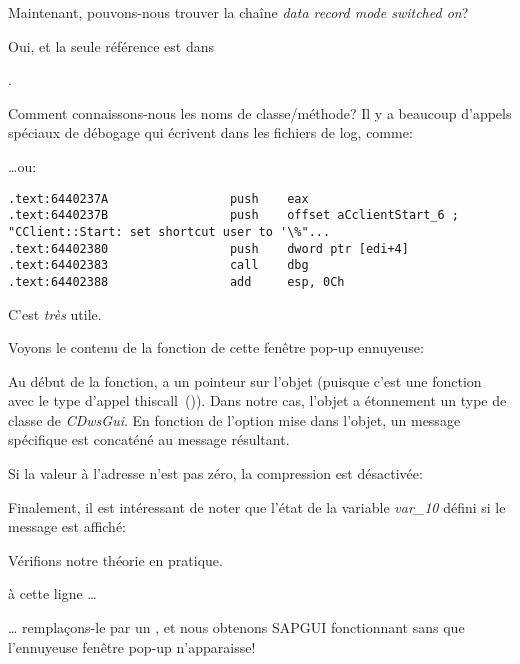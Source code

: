 Maintenant, pouvons-nous trouver la chaîne \emph{data record mode switched on}?

Oui, et la seule référence est dans
\par {}.

Comment connaissons-nous les noms de classe/méthode? Il y a beaucoup d'appels spéciaux
de débogage qui écrivent dans les fichiers de log, comme:



\dots ou:

\begin{lstlisting}[style=customasmx86]
.text:6440237A                 push    eax
.text:6440237B                 push    offset aCclientStart_6 ; "CClient::Start: set shortcut user to '\%"...
.text:64402380                 push    dword ptr [edi+4]
.text:64402383                 call    dbg
.text:64402388                 add     esp, 0Ch
\end{lstlisting}

C'est \emph{très} utile.

Voyons le contenu de la fonction de cette fenêtre pop-up ennuyeuse:



Au début de la fonction, \ECX a un pointeur sur l'objet (puisque c'est une fonction
avec le type d'appel thiscall~()).
Dans notre cas, l'objet a étonnement un type de classe de \emph{CDwsGui}.
En fonction de l'option mise dans l'objet, un message spécifique est concaténé au
message résultant.

Si la valeur à l'adresse  n'est pas zéro, la compression est désactivée:



Finalement, il est intéressant de noter que l'état de la variable \emph{var\_10}
défini si le message est affiché:



Vérifions notre théorie en pratique.

\JNZ à cette ligne \dots



\dots 
remplaçons-le par un \JMP, et nous obtenons SAPGUI fonctionnant sans que l'ennuyeuse
fenêtre pop-up n'apparaisse!

